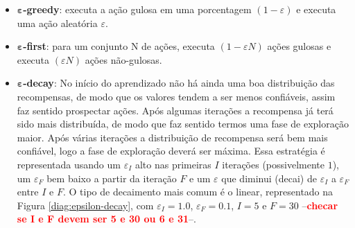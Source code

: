 \documentclass{article}
\newcommand{\todo}[1]{ --\textcolor{red}{\textbf{#1}}--}
\begin{document}
                \begin{itemize}
                    \item \textbf{$\boldsymbol\varepsilon$-greedy}: executa a ação gulosa em uma porcentagem $(1-\varepsilon)$ e executa uma ação aleatória $\varepsilon$.
                    \item \textbf{$\boldsymbol\varepsilon$-first}: para um conjunto N de ações, executa $(1 - \varepsilon N)$ ações gulosas e executa $(\varepsilon N)$ ações não-gulosas.
                    \item \textbf{$\boldsymbol\varepsilon$-decay}: No início do aprendizado não há ainda uma boa distribuição das recompensas, de modo que os valores tendem a ser menos confiáveis, assim faz sentido prospectar ações. Após algumas iterações a recompensa já terá sido mais distribuída, de modo que faz sentido termos uma fase de exploração maior. Após várias iterações a distribuição de recompensa será bem mais confiável, logo a fase de exploração deverá ser máxima. Essa estratégia é representada usando um $\varepsilon_{I}$ alto nas primeiras $I$ iterações (possivelmente $1$), um $\varepsilon_{F}$ bem baixo a partir da iteração $F$ e um $\varepsilon$ que diminui (decai) de $\varepsilon_{I}$ a $\varepsilon_{F}$ entre $I$ e $F$. O tipo de decaimento mais comum é o linear, representado na Figura \ref{diag:epsilon-decay}, com $\varepsilon_{I} = 1.0$, $\varepsilon_{F} = 0.1$, $I = 5$ e $F = 30$ \todo{checar se I e F devem ser 5 e 30 ou 6 e 31}.
                    
                    \begin{figure}[ht]
                        \centering
                        

\end{figure}
\end{itemize}
\end{document}
